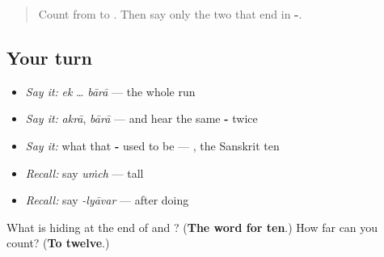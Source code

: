 \begin{quote}
Count from \textbf{} to \textbf{}. Then say only the two that end in \textbf{-}.
\end{quote}

\subsection*{Your turn}
\begin{itemize}
\raggedright
  \item \emph{Say it:} \emph{ek} … \emph{bārā} — the whole run
  \item \emph{Say it:} \emph{akrā}, \emph{bārā} — and hear the same \textbf{-} twice
  \item \emph{Say it:} what that \textbf{-} used to be — \emph{\textbf{}}, the Sanskrit ten
  \item \emph{Recall:} say \emph{uṁch} — tall
  \item \emph{Recall:} say \emph{-lyāvar} — after doing
\end{itemize}

\begin{tcolorbox}[breakable,colback=teal!4,colframe=teal!35!black,title={Before you move on}]
What is hiding at the end of \textbf{} and \textbf{}? (\textbf{The word for ten}.) How far can you count? (\textbf{To twelve}.)
\end{tcolorbox}
